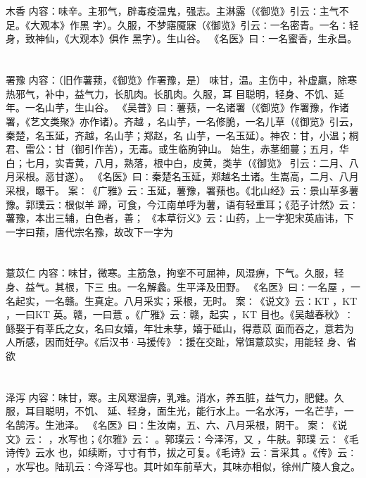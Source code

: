 \documentclass[12pt,UTF8]{ctexbook}
\begin{document}
\chapter{}木香
内容：味辛。主邪气，辟毒疫温鬼，强志。主淋露（《御览》引云∶主气不足。《大观本》作黑 
字）。久服，不梦寤魇寐（《御览》引云∶一名密青。一名∶轻身，致神仙，《大观本》俱作 
黑字）。生山谷。 
《名医》曰∶一名蜜香，生永昌。 


\chapter{}署豫
内容：（旧作薯蓣，《御览》作署豫，是） 
味甘，温。主伤中，补虚羸，除寒热邪气，补中，益气力，长肌肉。长肌肉。久服，耳 
目聪明，轻身、不饥、延年。一名山芋，生山谷。 
《吴普》曰∶薯蓣，一名诸署（《御览》作署豫，作诸署，《艺文类聚》亦作诸）。齐越 
，名山芋，一名修脆，一名儿草（《御览》引云，秦楚，名玉延，齐越，名山芋；郑赵，名 
山芋，一名玉延）。神农∶甘，小温；桐君、雷公∶甘（御引作苦），无毒。或生临朐钟山。 
始生，赤茎细蔓；五月，华白；七月，实青黄，八月，熟落，根中白，皮黄，类芋（《御览》 
引云∶二月、八月采根。恶甘遂）。 
《名医》曰∶秦楚名玉延，郑越名土诸。生嵩高，二月、八月采根，曝干。 
案∶《广雅》云∶玉延，薯豫，署蓣也。《北山经》云∶景山草多薯豫。郭璞云∶根似羊 
蹄，可食，今江南单呼为薯，语有轻重耳；《范子计然》云∶薯豫，本出三辅，白色者，善； 
《本草衍义》云∶山药，上一字犯宋英庙讳，下一字曰蓣，唐代宗名豫，故改下一字为 


\chapter{}薏苡仁
内容：味甘，微寒。主筋急，拘挛不可屈神，风湿痹，下气。久服，轻身、益气。其根，下三 
虫。一名解蠡。生平泽及田野。 
《名医》曰∶一名屋 ，一名起实，一名赣。生真定。八月采实；采根，无时。 
案∶《说文》云∶KT ，KT ，一曰KT 英。赣，一曰薏 。《广雅》云∶赣，起实 
，KT 目也。《吴越春秋》∶鲧娶于有莘氏之女，名曰女嬉，年壮未孳，嬉于砥山，得薏苡 
面而吞之，意若为人所感，因而妊孕。《后汉书·马援传》∶援在交趾，常饵薏苡实，用能轻 
身、省欲 


\chapter{}泽泻
内容：味甘，寒。主风寒湿痹，乳难。消水，养五脏，益气力，肥健。久服，耳目聪明，不饥、 
延、轻身，面生光，能行水上。一名水泻，一名芒芋，一名鹄泻。生池泽。 
《名医》曰∶生汝南，五、六、八月采根，阴干。 
案∶《说文》云∶ ，水写也；《尔雅》云∶ 。郭璞云∶今泽泻，又 ，牛肤。郭璞 
云∶《毛诗传》云水 也，如续断，寸寸有节，拔之可复。《毛诗》云∶言采其 。《传》云∶ 
，水写也。陆玑云∶今泽写也。其叶如车前草大，其味亦相似，徐州广陵人食之。 
\end{document}
